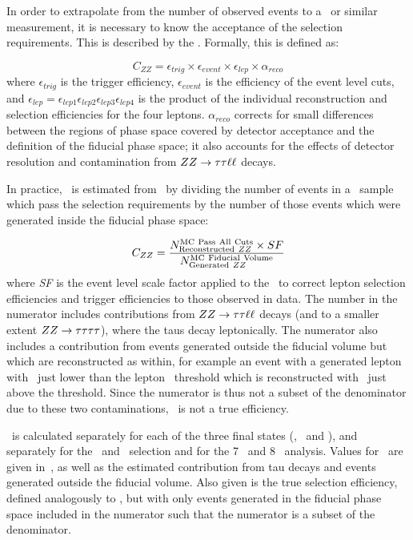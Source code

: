 In order to extrapolate from the number of observed events to a \cx\ or similar
measurement, it is necessary to know the acceptance of the selection
requirements. This is described by the . Formally, this is defined as:

\begin{equation}
C_{ZZ}= \epsilon_{trig} \times \epsilon_{event} \times \epsilon_{lep} \times \alpha_{reco}
\end{equation}
where $\epsilon_{trig}$ is the trigger efficiency, $\epsilon_{event}$ is 
the efficiency of the event level cuts, and
$\epsilon_{lep} =\epsilon_{lep1}\epsilon_{lep2}\epsilon_{lep3}\epsilon_{lep4}$ is the product of the 
individual reconstruction and selection efficiencies for the four leptons. 
$\alpha_{reco}$ corrects for small differences between the
regions of phase space covered by detector acceptance and the definition of the
fiducial phase space; it also accounts for the effects of detector resolution and
contamination from $ZZ\rightarrow\tau\tau\ell\ell$ decays.

In practice, \CZZ\ is estimated from \mc\ by dividing the number of events in a
\ZZllll\ sample which pass the selection requirements by the number of those events
which were generated inside the fiducial phase space:

\begin{equation}
C_{ZZ}= \frac{ N^{\rm MC\ Pass\ All\ Cuts}_{{\rm Reconstructed}\ ZZ} \times
SF }{ N^{{\rm MC\ Fiducial\ Volume}}_{{\rm Generated}\ ZZ} }
\end{equation}
where {\it SF} is the event level scale factor applied to the \mc\ to correct
lepton selection efficiencies and trigger efficiencies to those observed in
data. The number in the numerator includes contributions from
$ZZ\rightarrow\tau\tau\ell\ell$ decays (and to a smaller extent
$ZZ\rightarrow\tau\tau\tau\tau$), where the taus decay leptonically. The numerator also
includes a contribution from events generated outside the fiducial volume but
which are reconstructed as within, for example an event with a generated lepton
with \pt\ just lower than the lepton \pt\ threshold which is reconstructed
with \pt\ just above the threshold. Since the numerator is thus not a subset of
the denominator due to these two contaminations, \CZZ\ is not a true efficiency. 

\CZZ\ is calculated separately for each of the three final states (\eeee, \mmmm\
and \eemm), and separately for the \ZZ\ and \ZZs\ selection and for the 7 \tev\
and 8 \tev\ analysis. Values for \CZZ\ are given
in~\tabs{objSel-czz-seven}{objSel-czz-eight}, as well as the estimated
contribution from tau decays and events generated outside the fiducial volume.
Also given is the true selection efficiency, defined analogously to \CZZ, but
with only events generated in the fiducial phase space included in the numerator
such that the numerator is a subset of the denominator.

